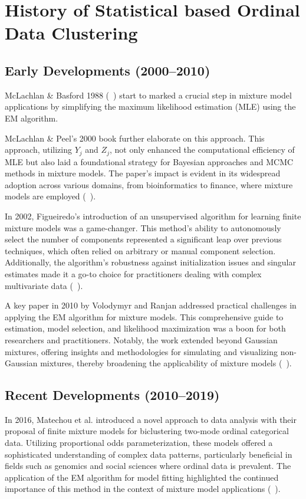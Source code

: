 \documentclass{article}
\begin{document}
\section{History of Statistical based Ordinal Data Clustering}

\subsection*{Early Developments (2000--2010)}

McLachlan \& Basford 1988 (~\cite{mclachlan1988mixture}) start to marked a crucial step in mixture model applications by simplifying the maximum likelihood estimation (MLE) using the EM algorithm.

McLachlan \& Peel's 2000 book further elaborate on this approach. This approach, utilizing $Y_j$ and $Z_j$, not only enhanced the computational efficiency of MLE but also laid a foundational strategy for Bayesian approaches and MCMC methods in mixture models. The paper’s impact is evident in its widespread adoption across various domains, from bioinformatics to finance, where mixture models are employed (~\cite{mclachlan2000finite}).

In 2002, Figueiredo's introduction of an unsupervised algorithm for learning finite mixture models was a game-changer. This method's ability to autonomously select the number of components represented a significant leap over previous techniques, which often relied on arbitrary or manual component selection. Additionally, the algorithm's robustness against initialization issues and singular estimates made it a go-to choice for practitioners dealing with complex multivariate data (~\cite{figueiredo2002unsupervised}).

A key paper in 2010 by Volodymyr and Ranjan addressed practical challenges in applying the EM algorithm for mixture models. This comprehensive guide to estimation, model selection, and likelihood maximization was a boon for both researchers and practitioners. Notably, the work extended beyond Gaussian mixtures, offering insights and methodologies for simulating and visualizing non-Gaussian mixtures, thereby broadening the applicability of mixture models (~\cite{10.1214/09-SS053}).

\subsection*{Recent Developments (2010--2019)}

In 2016, Matechou et al. introduced a novel approach to data analysis with their proposal of finite mixture models for biclustering two-mode ordinal categorical data. Utilizing proportional odds parameterization, these models offered a sophisticated understanding of complex data patterns, particularly beneficial in fields such as genomics and social sciences where ordinal data is prevalent. The application of the EM algorithm for model fitting highlighted the continued importance of this method in the context of mixture model applications (~\cite{matechou2016biclustering}).
\end{document}
